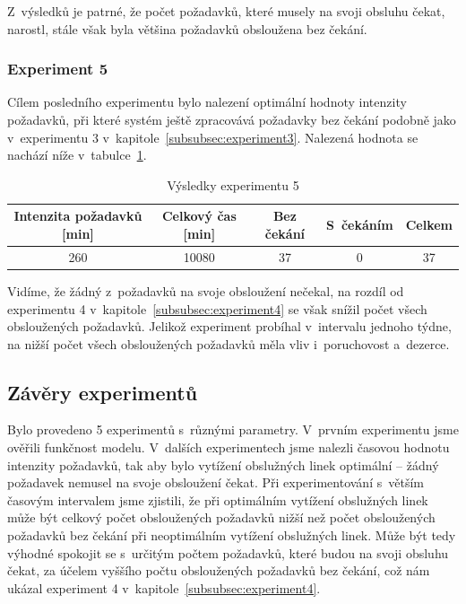 \documentclass[a4paper]{article}
\begin{document}
                Z~výsledků je patrné, že počet požadavků, které musely na svoji obsluhu čekat, narostl,
                stále však byla většina požadavků obsloužena bez čekání.

            \subsubsection{Experiment 5}
            \label{subsubsec:experiment5}

                Cílem posledního experimentu bylo nalezení optimální hodnoty intenzity požadavků, při které systém ještě zpracovává požadavky bez čekání
                podobně jako v~experimentu 3 v~kapitole~\ref{subsubsec:experiment3}. Nalezená hodnota se nachází níže v~tabulce~\ref{tab:experiment5}.
    
                \begin{table}[H]
                    \centering
                    \begin{tabular}{ | c | c | c | c | c | }
                        \hline
                        Intenzita požadavků [min] & Celkový čas [min] & Bez čekání & S~čekáním & Celkem \\
                        \hline
                        \hline
                        260 & 10080 & 37 & 0 & 37 \\
                        \hline
                    \end{tabular}
                    \caption{Výsledky experimentu 5}
                    \label{tab:experiment5}
                \end{table}

                Vidíme, že žádný z~požadavků na svoje obsloužení nečekal, na rozdíl od experimentu 4 v~kapitole~\ref{subsubsec:experiment4} se však snížil počet všech obsloužených požadavků.
                Jelikož experiment probíhal v~intervalu jednoho týdne, na nižší počet všech obsloužených požadavků měla vliv i~poruchovost a~dezerce.

        \subsection{Závěry experimentů}
        \label{subsec:experiments_summary}

            Bylo provedeno 5 experimentů s~různými parametry. V~prvním experimentu jsme ověřili funkčnost modelu. V~dalších experimentech jsme nalezli
            časovou hodnotu intenzity požadavků, tak aby bylo vytížení obslužných linek optimální -- žádný požadavek nemusel na svoje obsloužení čekat.
            Při experimentování s~větším časovým intervalem jsme zjistili, že při optimálním vytížení obslužných linek
            může být celkový počet obsloužených požadavků nižší než počet obsloužených požadavků bez čekání při neoptimálním vytížení
            obslužných linek. Může být tedy výhodné spokojit se s~určitým počtem požadavků, které budou na svoji obsluhu čekat, za účelem
            vyššího počtu obsloužených požadavků bez čekání, což nám ukázal experiment 4 v~kapitole~\ref{subsubsec:experiment4}.
            
\end{document}
